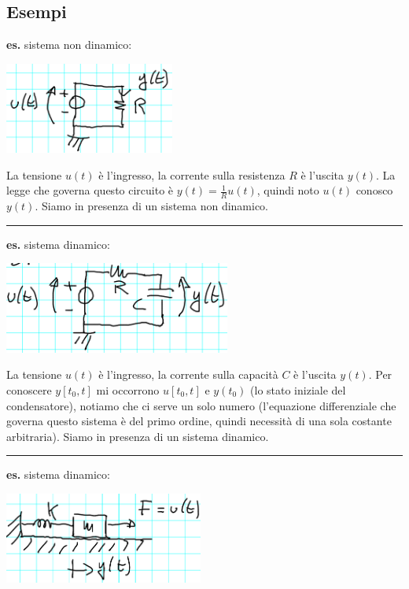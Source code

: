 \subsection{Esempi}
\textbf{es.} sistema non dinamico:
\begin{center}
    \includegraphics[height=3cm]{../lezione2/img2.PNG}
\end{center}
La tensione $u(t)$ è l'ingresso, la corrente sulla resistenza $R$ è l'uscita $y(t)$. La legge che governa questo circuito è $y(t) = \frac{1}{R}u(t)$, quindi noto $u(t)$ conosco $y(t)$. Siamo in presenza di un sistema non dinamico.\newline
\rule{\textwidth}{0,4pt}
\newline
\newline
\textbf{es.} sistema dinamico:
\begin{center}
    \includegraphics[height=3cm]{../lezione2/img3.PNG}
\end{center}
La tensione $u(t)$ è l'ingresso, la corrente sulla capacità $C$ è l'uscita $y(t)$. Per conoscere $y[t_0,t]$ mi occorrono $u[t_0,t]$ e $y(t_0)$ (lo stato iniziale del condensatore), notiamo che ci serve un solo numero (l'equazione differenziale che governa questo sistema è del primo ordine, quindi necessità di una sola costante arbitraria). Siamo in presenza di un sistema dinamico.\newline
\rule{\textwidth}{0,4pt}
\newline
\newline
\textbf{es.} sistema dinamico:
\begin{center}
    \includegraphics[height=3cm]{../lezione2/img4.PNG}
\end{center}
